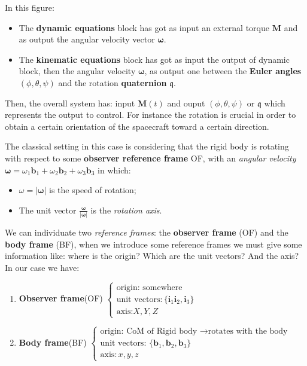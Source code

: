 In this figure:
\begin{itemize}
    \itemsep0em
    \item The \textbf{dynamic equations} block has got as input an external torque $\mathbf{M}$ and as output the angular velocity vector $\boldsymbol{\omega}$.
    \item The \textbf{kinematic equations} block has got as input the output of dynamic block, then the angular velocity  $\boldsymbol{\omega}$, as output one between the \textbf{Euler angles} $(\phi, \theta, \psi)$ and the rotation \textbf{quaternion} $\mathfrak{q}$.
\end{itemize}

Then, the overall system has: input $\mathbf{M}(t)$ and ouput $(\phi, \theta, \psi)$ or $\mathfrak{q}$ which represents the output to control. For instance the rotation is crucial in order to obtain a certain orientation of the spacecraft toward a certain direction. 

The classical setting in this case is considering that the rigid body is rotating with respect to some \textbf{observer reference frame} \textsf{OF}, with an \textit{angular velocity} $\boldsymbol{\omega}=\omega_1\mathbf{b}_1 + \omega_2\mathbf{b}_2+\omega_3\mathbf{b}_3$ in which:
\begin{itemize}
    \itemsep0em
    \item $\omega=\vert \boldsymbol{\omega} \vert$ is the speed of rotation; 
    \item The unit vector $\frac{\boldsymbol{\omega}}{\vert \boldsymbol{\omega} \vert}$ is the \textit{rotation axis}.
\end{itemize}

We can individuate two \textit{reference frames}: the \textbf{observer frame} (\textsf{OF}) and the \textbf{body frame} (\textsf{BF}), when we introduce some reference frames we must give some information like: where is the origin? Which are the unit vectors? And the axis? In our case we have:
\begin{enumerate}
    \item \textbf{Observer frame}(\textsf{OF}) $\begin{cases}
        \text{origin: somewhere}\\
        \text{unit vectors}: \{\mathbf{i}_1 
        \mathbf{i}_2, \mathbf{i}_3\}\\
        \text{axis:} X, Y, Z 
    \end{cases}$
    \item \textbf{Body frame}(\textsf{BF}) $\begin{cases}
        \text{origin: CoM of Rigid body }\to \text{rotates with the body}\\
        \text{unit vectors: } \{\mathbf{b}_1, \mathbf{b}_2, \mathbf{b}_3\}\\
        \text{axis}: x, y, z
    \end{cases}$
\end{enumerate} 

